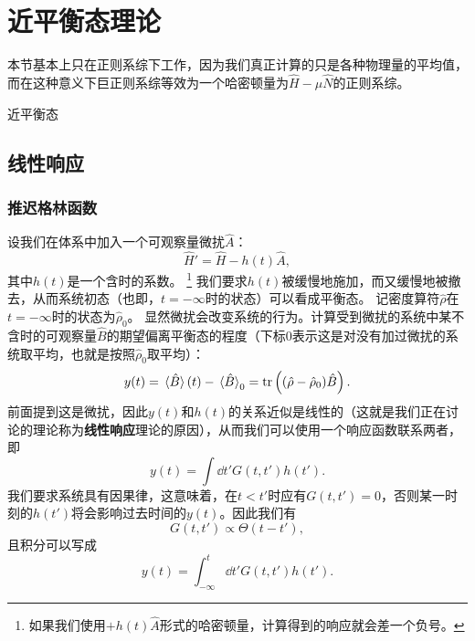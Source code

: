\documentclass[hyperref, UTF8, a4paper]{ctexart}
\begin{document}
\section{近平衡态理论}


本节基本上只在正则系综下工作，因为我们真正计算的只是各种物理量的平均值，而在这种意义下巨正则系综等效为一个哈密顿量为$\hat{H}-\mu\hat{N}$的正则系综。

近平衡态

\subsection{线性响应}

\subsubsection{推迟格林函数}

设我们在体系中加入一个可观察量微扰$\hat{A}$：
\begin{equation}
    \hat{H}' = \hat{H} - h(t) \hat{A},
\end{equation}
其中$h(t)$是一个含时的系数。%
\footnote{如果我们使用$+ h(t) \hat{A}$形式的哈密顿量，计算得到的响应就会差一个负号。}%
我们要求$h(t)$被缓慢地施加，而又缓慢地被撤去，从而系统初态（也即，$t=-\infty$时的状态）可以看成平衡态。
记密度算符$\hat{\rho}$在$t=-\infty$时的状态为$\hat{\rho}_0$。
显然微扰会改变系统的行为。计算受到微扰的系统中某不含时的可观察量$\hat{B}$的期望偏离平衡态的程度（下标0表示这是对没有加过微扰的系统取平均，也就是按照$\hat{\rho}_0$取平均）：
\[
    y(t) = \expval*{\hat{B}}(t) - \expval*{\hat{B}}_0 = \trace\left((\hat{\rho} - \hat{\rho}_0)\hat{B}\right).
\]
前面提到这是微扰，因此$y(t)$和$h(t)$的关系近似是线性的（这就是我们正在讨论的理论称为\textbf{线性响应}理论的原因），从而我们可以使用一个响应函数联系两者，即
\[
    y(t) = \int \dd{t'} G(t, t') h(t').
\]
我们要求系统具有因果律，这意味着，在$t<t'$时应有$G(t,t')=0$，否则某一时刻的$h(t')$将会影响过去时间的$y(t)$。因此我们有
\[
    G(t,t') \propto \Theta(t-t'),
\]
且积分可以写成
\[
    y(t) = \int_{-\infty}^t \dd{t'} G(t, t') h(t').
\]
\end{document}
